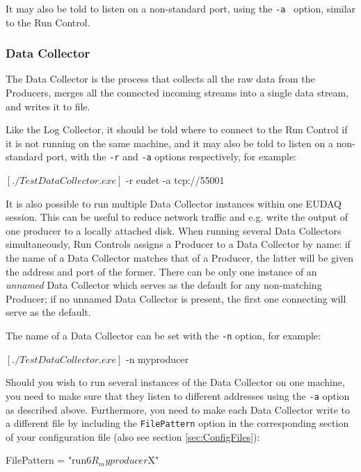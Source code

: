 It may also be told to listen on a non-standard port, using the \texttt{-a } option, similar to the Run Control.

\subsubsection{Data Collector}
The Data Collector is the process that collects all the raw data from the Producers,
merges all the connected incoming streams into a single data stream, and writes it to file.

Like the Log Collector, it should be told where to connect to the Run Control if it is not running on the same machine,
and it may also be told to listen on a non-standard port, with the \texttt{-r} and \texttt{-a} options respectively, for example:
\begin{listing}[mybash]
$[./TestDataCollector.exe]$ -r eudet -a tcp://55001
\end{listing}

It is also possible to run multiple Data Collector instances within
one EUDAQ session. This can be useful to reduce network traffic and
e.g. write the output of one producer to a locally attached disk. When running
several Data Collectors simultaneously, Run Controls assigns a
Producer to a Data Collector by name: if the name of a Data Collector
matches that of a Producer, the latter will be given the address and
port of the former. There can be only one instance of an \emph{unnamed} Data
Collector which serves as the default for any non-matching Producer;
if no unnamed Data Collector is present, the first one connecting will
serve as the default.

The name of a Data Collector can be set with the
\texttt{-n} option, for example:
\begin{listing}[mybash]
$[./TestDataCollector.exe]$ -n myproducer
\end{listing}

Should you wish to run several instances of the Data Collector on one
machine, you need to make sure that they listen to different addresses
using the \texttt{-a} option as described above. Furthermore, you need
to make each Data Collector write to a different file by including the
\texttt{FilePattern} option in the corresponding section of your
configuration file (also see section \ref{sec:ConfigFiles}):

\begin{listing}
FilePattern = "run$6R_myproducer$X"
\end{listing}

